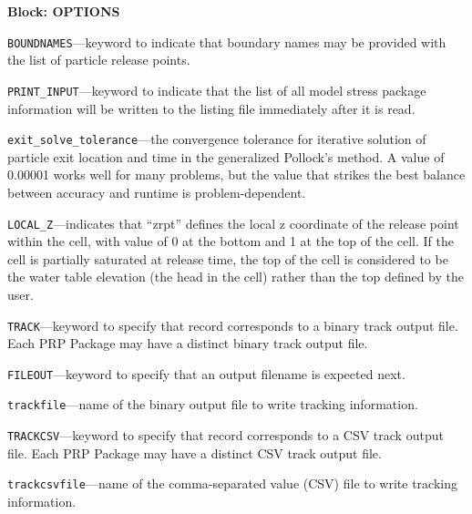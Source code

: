 
\item \textbf{Block: OPTIONS}

\begin{description}
\item \texttt{BOUNDNAMES}---keyword to indicate that boundary names may be provided with the list of particle release points.

\item \texttt{PRINT\_INPUT}---keyword to indicate that the list of all model stress package information will be written to the listing file immediately after it is read.

\item \texttt{exit\_solve\_tolerance}---the convergence tolerance for iterative solution of particle exit location and time in the generalized Pollock's method.  A value of 0.00001 works well for many problems, but the value that strikes the best balance between accuracy and runtime is problem-dependent.

\item \texttt{LOCAL\_Z}---indicates that ``zrpt'' defines the local z coordinate of the release point within the cell, with value of 0 at the bottom and 1 at the top of the cell.  If the cell is partially saturated at release time, the top of the cell is considered to be the water table elevation (the head in the cell) rather than the top defined by the user.

\item \texttt{TRACK}---keyword to specify that record corresponds to a binary track output file.  Each PRP Package may have a distinct binary track output file.

\item \texttt{FILEOUT}---keyword to specify that an output filename is expected next.

\item \texttt{trackfile}---name of the binary output file to write tracking information.

\item \texttt{TRACKCSV}---keyword to specify that record corresponds to a CSV track output file.  Each PRP Package may have a distinct CSV track output file.

\item \texttt{trackcsvfile}---name of the comma-separated value (CSV) file to write tracking information.


\end{description}
